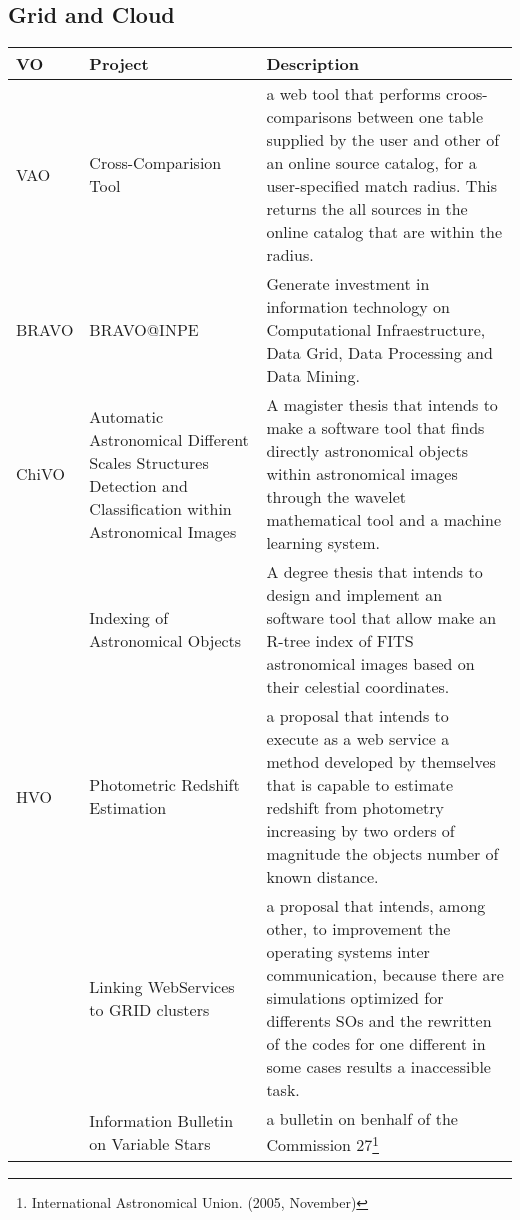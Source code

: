 
\subsection{Grid and Cloud}
\begin{table*}[h!t]
	\centering
	\begin{tabular}{|l|p{3cm}|p{12.5cm}|}
	\hline
	\textbf{VO} & \textbf{Project} & \textbf{Description}\\
	\hline
	VAO 	& Cross-Comparision Tool & a web tool that performs croos-comparisons between one table supplied by the user and other of an online source 
								catalog, for a user-specified match radius. This returns the all sources in the online catalog that are within the radius.\\
	\hline
	BRAVO	& BRAVO@INPE & Generate investment in information technology on Computational Infraestructure, Data Grid, Data Processing and Data Mining.\\
	\hline
	ChiVO	& Automatic Astronomical Different Scales Structures Detection and Classification within Astronomical Images & A magister thesis that intends to 
								make a software tool that finds directly astronomical objects within astronomical images through the wavelet mathematical 
								tool and a machine learning system.\\
			& Indexing of Astronomical Objects & A degree thesis that intends to design and implement an software tool that allow make an R-tree index of 
								FITS astronomical images based on their celestial coordinates. \\
	\hline
	HVO		& Photometric Redshift Estimation & a proposal that intends to execute as a web service a method developed by themselves that is capable to 
								estimate redshift from photometry increasing by two orders of magnitude the objects number of known distance. \\
			& Linking WebServices to GRID clusters & a proposal that intends, among other, to improvement the operating systems inter communication, because 
								there are simulations optimized for differents SOs and the rewritten of the codes for one different in some cases results a 
								inaccessible task.\\
			& Information Bulletin on Variable Stars & a bulletin on benhalf of the Commission 27\footnote{International Astronomical Union. (2005, November)
}
\end{tabular}
\end{table*}
